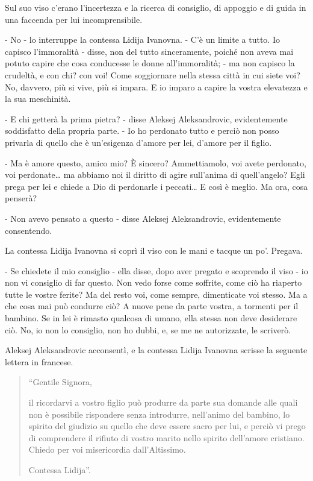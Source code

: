 Sul suo viso c'erano l'incertezza e la ricerca di consiglio, di appoggio e di guida in una faccenda per lui incomprensibile. 

- No - lo interruppe la contessa Lidija Ivanovna. - C'è un limite a tutto. Io capisco l'immoralità - disse, non del tutto sinceramente, poiché non aveva mai potuto capire che cosa conducesse le donne all'immoralità; - ma non capisco la crudeltà, e con chi? con voi! Come soggiornare nella stessa città in cui siete voi? No, davvero, più si vive, più si impara. E io imparo a capire la vostra elevatezza e la sua meschinità. 

- E chi getterà la prima pietra? - disse Aleksej Aleksandrovic, evidentemente soddisfatto della propria parte. - Io ho perdonato tutto e perciò non posso privarla di quello che è un'esigenza d'amore per lei, d'amore per il figlio. 

- Ma è amore questo, amico mio? È sincero? Ammettiamolo, voi avete perdonato, voi perdonate\ldots{} ma abbiamo noi il diritto di agire sull'anima di quell'angelo? Egli prega per lei e chiede a Dio di perdonarle i peccati\ldots{} E così è meglio. Ma ora, cosa penserà? 

- Non avevo pensato a questo - disse Aleksej Aleksandrovic, evidentemente consentendo. 

La contessa Lidija Ivanovna si coprì il viso con le mani e tacque un po'. Pregava. 

- Se chiedete il mio consiglio - ella disse, dopo aver pregato e scoprendo il viso - io non vi consiglio di far questo. Non vedo forse come soffrite, come ciò ha riaperto tutte le vostre ferite? Ma del resto voi, come sempre, dimenticate voi stesso. Ma a che cosa mai può condurre ciò? A nuove pene da parte vostra, a tormenti per il bambino. Se in lei è rimasto qualcosa di umano, ella stessa non deve desiderare ciò. No, io non lo consiglio, non ho dubbi, e, se me ne autorizzate, le scriverò. 

Aleksej Aleksandrovic acconsentì, e la contessa Lidija Ivanovna scrisse la seguente lettera in francese. 

\begin{quote}
``Gentile Signora,

il ricordarvi a vostro figlio può produrre da parte sua domande alle quali non è possibile rispondere senza introdurre, nell'animo del bambino, lo spirito del giudizio su quello che deve essere sacro per lui, e perciò vi prego di comprendere il rifiuto di vostro marito nello spirito dell'amore cristiano. Chiedo per voi misericordia dall'Altissimo.

Contessa Lidija''.
\end{quote} 

